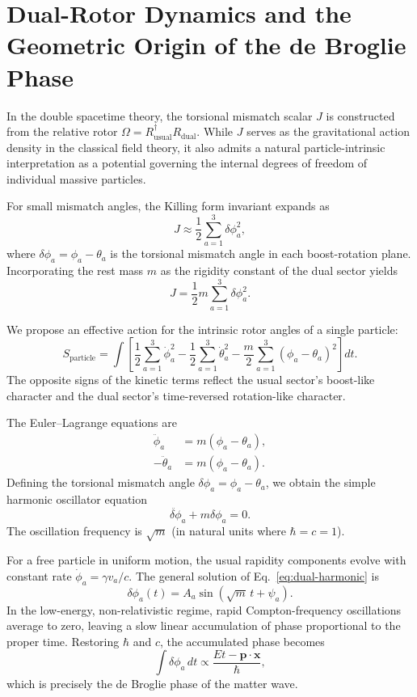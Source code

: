 \documentclass[dvipdfmx,a4paper]{article}
\begin{document}
\section{Dual-Rotor Dynamics and the Geometric Origin of the de Broglie Phase}
\label{sec:dualrotordynamics}

In the double spacetime theory, the torsional mismatch scalar $J$ is constructed from the relative rotor $\Omega = R_{\text{usual}}^\dagger R_{\text{dual}}$. While $J$ serves as the gravitational action density in the classical field theory, it also admits a natural particle-intrinsic interpretation as a potential governing the internal degrees of freedom of individual massive particles.

For small mismatch angles, the Killing form invariant expands as
\[
J \approx \frac{1}{2} \sum_{a=1}^3 \delta\phi_a^2,
\]
where $\delta\phi_a = \phi_a - \theta_a$ is the torsional mismatch angle in each boost-rotation plane. Incorporating the rest mass $m$ as the rigidity constant of the dual sector yields
\[
J = \frac{1}{2} m \sum_{a=1}^3 \delta\phi_a^2.
\]

We propose an effective action for the intrinsic rotor angles of a single particle:
\[
S_{\text{particle}} = \int \left[ \frac{1}{2} \sum_{a=1}^3 \dot{\phi}_a^2 - \frac{1}{2} \sum_{a=1}^3 \dot{\theta}_a^2 - \frac{m}{2} \sum_{a=1}^3 (\phi_a - \theta_a)^2 \right] dt.
\]
The opposite signs of the kinetic terms reflect the usual sector's boost-like character and the dual sector's time-reversed rotation-like character.

The Euler--Lagrange equations are
\begin{align}
\ddot{\phi}_a &= m (\phi_a - \theta_a), \\
-\ddot{\theta}_a &= m (\phi_a - \theta_a).
\end{align}
Defining the torsional mismatch angle $\delta\phi_a = \phi_a - \theta_a$, we obtain the simple harmonic oscillator equation
\begin{equation}
\ddot{\delta\phi}_a + m \delta\phi_a = 0.
\label{eq:dual-harmonic}
\end{equation}
The oscillation frequency is $\sqrt{m}$ (in natural units where $\hbar = c = 1$).

For a free particle in uniform motion, the usual rapidity components evolve with constant rate $\dot{\phi}_a = \gamma v_a/c$. The general solution of Eq.~\eqref{eq:dual-harmonic} is
\[
\delta\phi_a(t) = A_a \sin(\sqrt{m}\, t + \psi_a).
\]
In the low-energy, non-relativistic regime, rapid Compton-frequency oscillations average to zero, leaving a slow linear accumulation of phase proportional to the proper time. Restoring $\hbar$ and $c$, the accumulated phase becomes
\[
\int \delta\phi_a \, dt \propto \frac{E t - \mathbf{p} \cdot \mathbf{x}}{\hbar},
\]
which is precisely the de Broglie phase of the matter wave.
\end{document}
